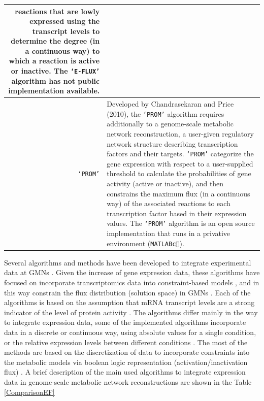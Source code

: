 \begin{center}
\begin{longtable}{|r|m{13cm}|}
reactions that are lowly expressed using the transcript levels to determine the degree (in a continuous way) to which a reaction is active or inactive. The \texttt{`E-FLUX'} algorithm has not public implementation available.\\
\hline
\texttt{`PROM'} \cite{Chandrasekaran2010} & Developed by Chandrasekaran and Price (2010), the \texttt{`PROM'} algorithm requires additionally to a genome-scale metabolic network reconstruction, a user-given regulatory network structure describing transcription factors and their targets. \texttt{`PROM'} categorize the gene expression with respect to a user-supplied threshold to calculate the probabilities of gene activity (active or inactive), and then constrains the maximum flux (in a continuous way) of the associated reactions to each transcription factor based in their expression values. The \texttt{`PROM'} algorithm is an open source implementation that runs in a privative environment (\texttt{MATLAB\textcircled{c}}). \\
\hline
\end{longtable}
\end{center}
Several algorithms and methods have been developed to integrate experimental data at GMNs \cite{Machado2014}. Given the increase of gene expression data, these algorithms have focused on incorporate transcriptomics data into constraint-based models \cite{covert2002transcriptional, aakesson2004integration,covert2004integrating}, and in this way constrain the flux distribution (solution space) in GMNs \cite{schellenberger2011quantitative, reed2012shrinking}. Each of the algorithms is based on the assumption that mRNA transcript levels are a strong indicator of the level of protein activity \cite{blazier2012integration}. The algorithms differ mainly in the way to integrate expression data, some of the implemented algorithms incorporate data in a discrete or continuous way, using absolute values for a single condition, or the relative expression levels between different conditions \cite{machado2014systematic}. The most of the methods are based on the discretization of data to incorporate constraints into the metabolic models via boolean logic representation (activation/inactivation flux) \cite{blazier2012integration}. A brief description of the main used algorithms to integrate expression data in genome-scale metabolic network reconstructions are shown in the Table \ref{ComparisonEF}\\

